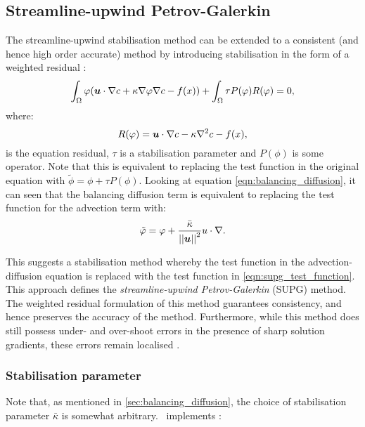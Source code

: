 \subsection{Streamline-upwind Petrov-Galerkin}\label{sec:supg}

The streamline-upwind stabilisation method can be extended to a consistent (and
hence high order accurate) method by introducing stabilisation in the form of a weighted
residual \citep{DoneaBook}:
\begin{equation*}
  \int_\Omega \varphi ({\mbox{\boldmath$u$}} \cdot \nabla c + \kappa \nabla \varphi \nabla c - f(x)) +
  \int_\Omega \tau P(\varphi) R(\varphi)
  = 0,
\end{equation*}
where:
\begin{equation*}
  R(\varphi) = {\mbox{\boldmath$u$}} \cdot \nabla c - \kappa \nabla^2 c - f(x),
\end{equation*}
is the equation residual, $\tau$ is a stabilisation parameter and $P(\phi)$ is
some operator.
Note that this is equivalent to replacing the test function in the original
equation with $\tilde{\phi} = \phi + \tau P(\phi)$.
Looking at equation \eqref{eqn:balancing_diffusion}, it can seen that the
balancing diffusion term is equivalent to replacing the test function for the
advection term with:
\begin{equation}\label{eqn:supg_test_function}
  \tilde{\varphi} = \varphi + \frac{\bar{\kappa}}{\left|\left| {\mbox{\boldmath$u$}} \right|\right|^2} u \cdot \nabla.
\end{equation}

This suggests a stabilisation method whereby the test function in the advection-diffusion
equation is replaced with the test function in \eqref{eqn:supg_test_function}.
This approach defines the \textit{streamline-upwind Petrov-Galerkin} (SUPG) method. The
weighted residual formulation of this method guarantees consistency, and hence
preserves the accuracy of the method. Furthermore, while this method does
still possess under- and over-shoot errors in the presence of sharp solution
gradients, these errors remain localised \citep{hughes1987}.

\subsubsection{Stabilisation parameter}\label{sec:stabilisation_parameter}

Note that, as mentioned in \ref{sec:balancing_diffusion}, the choice of
stabilisation parameter $\bar{\kappa}$ is somewhat arbitrary. \fluidity\ implements \citep{brooks1982, DoneaBook}:

